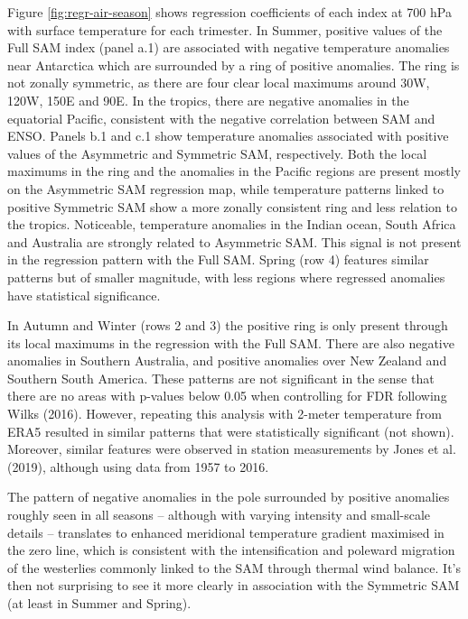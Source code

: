 \documentclass[smallextended]{svjour3}       %
\begin{document}
Figure \ref{fig:regr-air-season} shows regression coefficients of each index at 700 hPa with surface temperature for each trimester. In Summer, positive values of the Full SAM index (panel a.1) are associated with negative temperature anomalies near Antarctica which are surrounded by a ring of positive anomalies. The ring is not zonally symmetric, as there are four clear local maximums around 30\degree W, 120\degree W, 150\degree E and 90\degree E. In the tropics, there are negative anomalies in the equatorial Pacific, consistent with the negative correlation between SAM and ENSO. Panels b.1 and c.1 show temperature anomalies associated with positive values of the Asymmetric and Symmetric SAM, respectively. Both the local maximums in the ring and the anomalies in the Pacific regions are present mostly on the Asymmetric SAM regression map, while temperature patterns linked to positive Symmetric SAM show a more zonally consistent ring and less relation to the tropics. Noticeable, temperature anomalies in the Indian ocean, South Africa and Australia are strongly related to Asymmetric SAM. This signal is not present in the regression pattern with the Full SAM. Spring (row 4) features similar patterns but of smaller magnitude, with less regions where regressed anomalies have statistical significance.

In Autumn and Winter (rows 2 and 3) the positive ring is only present through its local maximums in the regression with the Full SAM. There are also negative anomalies in Southern Australia, and positive anomalies over New Zealand and Southern South America. These patterns are not significant in the sense that there are no areas with p-values below 0.05 when controlling for FDR following Wilks (2016). However, repeating this analysis with 2-meter temperature from ERA5 resulted in similar patterns that were statistically significant (not shown). Moreover, similar features were observed in station measurements by Jones et al. (2019), although using data from 1957 to 2016.

The pattern of negative anomalies in the pole surrounded by positive anomalies roughly seen in all seasons -- although with varying intensity and small-scale details -- translates to enhanced meridional temperature gradient maximised in the zero line, which is consistent with the intensification and poleward migration of the westerlies commonly linked to the SAM through thermal wind balance. It's then not surprising to see it more clearly in association with the Symmetric SAM (at least in Summer and Spring).
\end{document}
